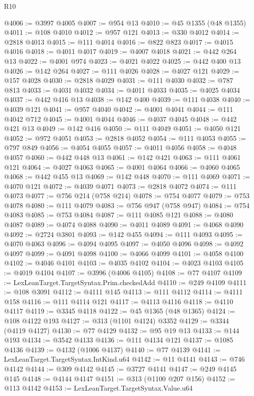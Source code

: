 \begin{lexlean}{R10}
\begin{coremodule}
@4006 := @3997 @4005
@4007 := @954 @13
@4010 := @45 @1355 (@48 @1355)
@4011 := @108 @4010
@4012 := @957 @121
@4013 := @330 @4012
@4014 := @2818 @4013
@4015 := @111 @4014
@4016 := @822 @823
@4017 := @4015 @4016
@4018 := @4011 @4017
@4019 := @4007 @4018
@4021 := @442 @264 @13
@4022 := @4001 @974
@4023 := @4021 @4022
@4025 := @442 @400 @13
@4026 := @142 @264
@4027 := @111 @4026
@4028 := @4027 @121
@4029 := @157 @4028
@4030 := @2818 @4029
@4031 := @111 @4030
@4032 := @787 @813
@4033 := @4031 @4032
@4034 := @4011 @4033
@4035 := @4025 @4034
@4037 := @442 @416 @13
@4038 := @142 @400
@4039 := @111 @4038
@4040 := @4039 @121
@4041 := @957 @4040
@4042 := @4001 @4041
@4044 := @111 @4042 @712
@4045 := @4001 @4044
@4046 := @4037 @4045
@4048 := @442 @421 @13
@4049 := @142 @416
@4050 := @111 @4049
@4051 := @4050 @121
@4052 := @972 @4051
@4053 := @2818 @4052
@4054 := @111 @4053
@4055 := @797 @849
@4056 := @4054 @4055
@4057 := @4011 @4056
@4058 := @4048 @4057
@4060 := @442 @448 @13
@4061 := @142 @421
@4063 := @111 @4061 @121
@4064 := @4027 @4063
@4065 := @4001 @4064
@4066 := @4060 @4065
@4068 := @442 @455 @13
@4069 := @142 @448
@4070 := @111 @4069
@4071 := @4070 @121
@4072 := @4039 @4071
@4073 := @2818 @4072
@4074 := @111 @4073
@4077 := @756 @214 (@758 @214)
@4078 := @754 @4077
@4079 := @753 @4078
@4080 := @111 @4079
@4083 := @756 @947 (@758 @947)
@4084 := @754 @4083
@4085 := @753 @4084
@4087 := @111 @4085 @121
@4088 := @4080 @4087
@4089 := @4074 @4088
@4090 := @4011 @4089
@4091 := @4068 @4090
@4092 := @2724 @3801
@4093 := @142 @455
@4094 := @111 @4093
@4095 := @4070 @4063
@4096 := @4094 @4095
@4097 := @4050 @4096
@4098 := @4092 @4097
@4099 := @4091 @4098
@4100 := @4066 @4099
@4101 := @4058 @4100
@4102 := @4046 @4101
@4103 := @4035 @4102
@4104 := @4023 @4103
@4105 := @4019 @4104
@4107 := @3996 (@4006 @4105)
@4108 := @77 @4107
@4109 := LexLeanTarget.TargetSyntax.Prim.checkedAdd
@4110 := @249 @4109
@4111 := @108 @3091
@4112 := @4111 @145
@4113 := @111 @4112
@4114 := @4111 @158
@4116 := @111 @4114 @121
@4117 := @4113 @4116
@4118 := @4110 @4117
@4119 := @3345 @4118
@4122 := @45 @1365 (@48 @1365)
@4124 := @108 @4122 @193
@4127 := @313 (@1101 @4124) @3352
@4129 := @3344 (@4119 @4127)
@4130 := @77 @4129
@4132 := @95 @19 @13
@4133 := @144 @193
@4134 := @3542 @4133
@4136 := @111 @4134 @121
@4137 := @1085 @4136
@4139 := @4132 (@1006 @4137)
@4140 := @77 @4139
@4141 := LexLeanTarget.TargetSyntax.IntKind.u64
@4142 := @11 @4141
@4143 := @746 @4142
@4144 := @309 @4142
@4145 := @3727 @4141
@4147 := @249 @4145 @145
@4148 := @4144 @4147
@4151 := @313 (@1100 @207 @156)
@4152 := @113 @4142
@4153 := LexLeanTarget.TargetSyntax.Value.u64

\end{coremodule}
\end{lexlean}
